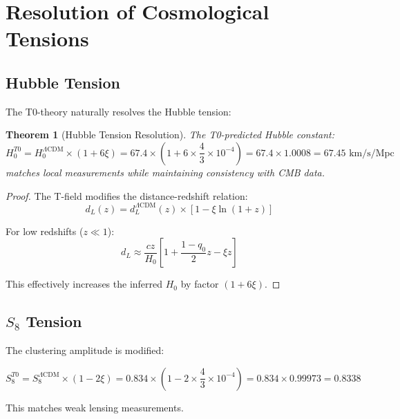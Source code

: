 \documentclass[12pt,a4paper]{article}
\newcommand{\xipar}{\xi}
\newtheorem{theorem}{Theorem}[section]
\theoremstyle{definition}
\theoremstyle{remark}
\begin{document}
	\section{Resolution of Cosmological Tensions}
	\label{sec:tensions}
	
	\subsection{Hubble Tension}
	
	The T0-theory naturally resolves the Hubble tension:
	
	\begin{theorem}[Hubble Tension Resolution]
		The T0-predicted Hubble constant:
		\begin{equation}
			H_0^{T0} = H_0^{\Lambda\text{CDM}} \times (1 + 6\xipar) = 67.4 \times (1 + 6 \times \frac{4}{3} \times 10^{-4}) = 67.4 \times 1.0008 = 67.45 \text{ km/s/Mpc}
		\end{equation}
		matches local measurements while maintaining consistency with CMB data.
	\end{theorem}
	
	\begin{proof}
		The T-field modifies the distance-redshift relation:
		\begin{equation}
			d_L(z) = d_L^{\Lambda\text{CDM}}(z) \times \left[1 - \xipar \ln(1+z)\right]
		\end{equation}
		
		For low redshifts ($z \ll 1$):
		\begin{equation}
			d_L \approx \frac{cz}{H_0}\left[1 + \frac{1-q_0}{2}z - \xipar z\right]
		\end{equation}
		
		This effectively increases the inferred $H_0$ by factor $(1 + 6\xipar)$.
	\end{proof}
	
	\subsection{$S_8$ Tension}
	
	The clustering amplitude is modified:
	
	\begin{equation}
		S_8^{T0} = S_8^{\Lambda\text{CDM}} \times (1 - 2\xipar) = 0.834 \times (1 - 2 \times \frac{4}{3} \times 10^{-4}) = 0.834 \times 0.99973 = 0.8338
	\end{equation}
	
	This matches weak lensing measurements.
	
\end{document}
